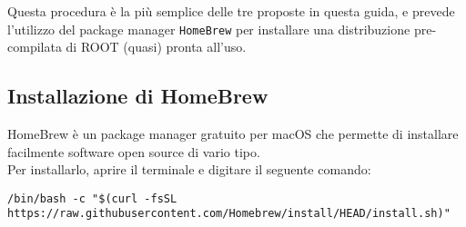 Questa procedura è la più semplice delle tre proposte in questa guida, e prevede l'utilizzo del package manager \texttt{HomeBrew} per installare una distribuzione pre-compilata di ROOT (quasi) pronta all'uso.\\

\subsection{Installazione di HomeBrew}
\label{brew-install}
HomeBrew è un package manager gratuito per macOS che permette di installare facilmente software open source di vario tipo. \\
Per installarlo, aprire il terminale e digitare il seguente comando:
\begin{lstlisting}
/bin/bash -c "$(curl -fsSL https://raw.githubusercontent.com/Homebrew/install/HEAD/install.sh)"
\end{lstlisting}
